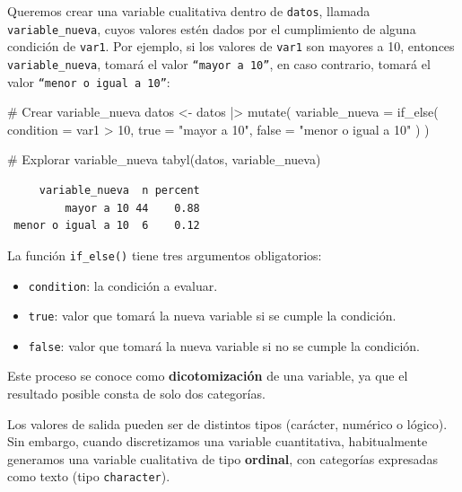 \documentclass[
  spanish,
  a4paper,
]{scrbook}
\newenvironment{Shaded}{\begin{snugshade}}{\end{snugshade}}
\newcommand{\AttributeTok}[1]{\textcolor[rgb]{0.40,0.45,0.13}{#1}}
\newcommand{\CommentTok}[1]{\textcolor[rgb]{0.37,0.37,0.37}{#1}}
\newcommand{\DecValTok}[1]{\textcolor[rgb]{0.68,0.00,0.00}{#1}}
\newcommand{\FunctionTok}[1]{\textcolor[rgb]{0.28,0.35,0.67}{#1}}
\newcommand{\NormalTok}[1]{\textcolor[rgb]{0.00,0.23,0.31}{#1}}
\newcommand{\OtherTok}[1]{\textcolor[rgb]{0.00,0.23,0.31}{#1}}
\newcommand{\SpecialCharTok}[1]{\textcolor[rgb]{0.37,0.37,0.37}{#1}}
\newcommand{\StringTok}[1]{\textcolor[rgb]{0.13,0.47,0.30}{#1}}
\begin{document}
Queremos crear una variable cualitativa dentro de \texttt{datos},
llamada \texttt{variable\_nueva}, cuyos valores estén dados por el
cumplimiento de alguna condición de \texttt{var1}. Por ejemplo, si los
valores de \texttt{var1} son mayores a 10, entonces
\texttt{variable\_nueva}, tomará el valor \texttt{“mayor\ a\ 10”}, en
caso contrario, tomará el valor \texttt{“menor\ o\ igual\ a\ 10”}:

\begin{Shaded}
\begin{Highlighting}[]
\CommentTok{\# Crear variable\_nueva}
\NormalTok{datos }\OtherTok{\textless{}{-}}\NormalTok{ datos }\SpecialCharTok{|\textgreater{}}
  \FunctionTok{mutate}\NormalTok{(}
    \AttributeTok{variable\_nueva =} \FunctionTok{if\_else}\NormalTok{(}
      \AttributeTok{condition =}\NormalTok{ var1 }\SpecialCharTok{\textgreater{}} \DecValTok{10}\NormalTok{,}
      \AttributeTok{true =} \StringTok{"mayor a 10"}\NormalTok{,}
      \AttributeTok{false =} \StringTok{"menor o igual a 10"}
\NormalTok{    )}
\NormalTok{  )}

\CommentTok{\# Explorar variable\_nueva}
\FunctionTok{tabyl}\NormalTok{(datos, variable\_nueva)}
\end{Highlighting}
\end{Shaded}

\begin{verbatim}
     variable_nueva  n percent
         mayor a 10 44    0.88
 menor o igual a 10  6    0.12
\end{verbatim}

La función \texttt{if\_else()} tiene tres argumentos obligatorios:

\begin{itemize}
\item
  \texttt{condition}: la condición a evaluar.
\item
  \texttt{true}: valor que tomará la nueva variable si se cumple la
  condición.
\item
  \texttt{false}: valor que tomará la nueva variable si no se cumple la
  condición.
\end{itemize}

Este proceso se conoce como \textbf{dicotomización} de una variable, ya
que el resultado posible consta de solo dos categorías.

Los valores de salida pueden ser de distintos tipos (carácter, numérico
o lógico). Sin embargo, cuando discretizamos una variable cuantitativa,
habitualmente generamos una variable cualitativa de tipo
\textbf{ordinal}, con categorías expresadas como texto (tipo
\texttt{character}).
\end{document}
